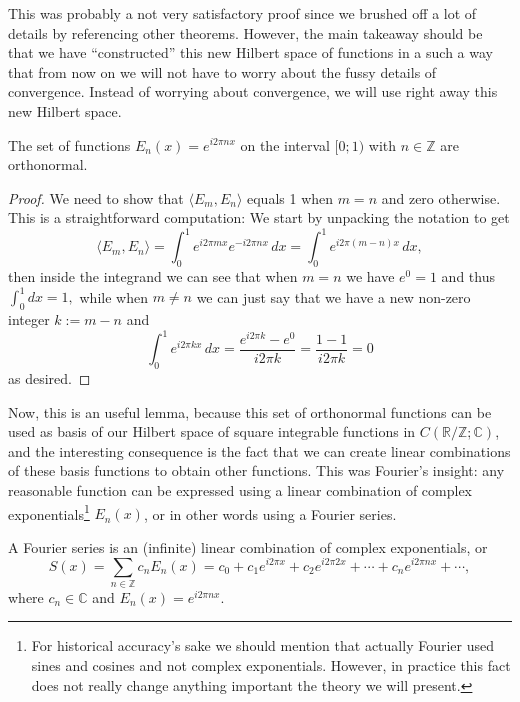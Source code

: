 This was probably a not very satisfactory proof since we brushed off a lot of
details by referencing other theorems. However, the main takeaway should be
that we have ``constructed'' this new Hilbert space of functions in a such a
way that from now on we will not have to worry about the fussy details of
convergence. Instead of worrying about convergence, we will use right away
this new Hilbert space.

\begin{lemma}
  \label{kugel:thm:exp-1d}
  The set of functions \(E_n(x) = e^{i2\pi nx}\) on the interval
  \([0; 1)\) with \(n \in \mathbb{Z} \) are orthonormal.
\end{lemma}
\begin{proof}
  We need to show that \(\langle E_m, E_n \rangle\) equals 1 when \(m = n\)
  and zero otherwise. This is a straightforward computation: We start by
  unpacking the notation to get
  \[
    \langle E_m, E_n \rangle
    = \int_0^1 e^{i2\pi mx} e^{- i2\pi nx} \, dx
    = \int_0^1 e^{i2\pi (m - n)x} \, dx,
  \]
  then inside the integrand we can see that when \(m = n\) we have \(e^0 = 1\) and
  thus \( \int_0^1 dx = 1, \) while when \(m \neq n\) we can just say that we
  have a new non-zero integer
  \(k := m - n\) and
  \[
    \int_0^1 e^{i2\pi kx} \, dx
    = \frac{e^{i2\pi k} - e^{0}}{i2\pi k}
    = \frac{1 - 1}{i2\pi k}
    = 0
  \]
  as desired. \qedhere
\end{proof}

Now, this is an useful lemma, because this set of orthonormal functions can be
used as basis of our Hilbert space of square integrable functions in
$C(\mathbb{R}/\mathbb{Z}; \mathbb{C})$, and the interesting consequence is the
fact that we can create linear combinations of these basis functions to obtain
other functions. This was Fourier's insight: any reasonable function can be
expressed using a linear combination of complex exponentials\footnote{For
historical accuracy's sake we should mention that actually Fourier used sines
and cosines and not complex exponentials. However, in practice this fact does
not really change anything important the theory we will present.} $E_n(x)$, or
in other words using a Fourier series.

\begin{definition}
  A Fourier series is an (infinite) linear combination of complex
  exponentials, or
  \begin{equation*}
    S(x) = \sum_{n \in \mathbb{Z}} c_n E_n(x)
      = c_0 + c_1 e^{i2\pi x} + c_2 e^{i2\pi 2x}
        + \cdots + c_n e^{i2\pi nx} + \cdots,
  \end{equation*}
  where $c_n \in \mathbb{C}$ and $E_n(x) = e^{i2\pi nx}$.
\end{definition}

